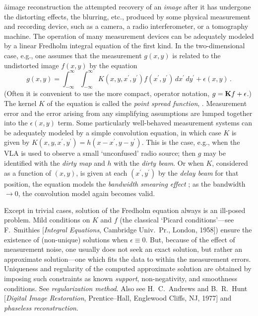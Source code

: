 \aa{image reconstruction}
the attempted recovery of an {\it image} after it has undergone
the distorting effects, the blurring, etc., produced by some
physical measurement and recording device, such as a camera,
a radio interferometer, or a tomography machine.
The operation of many measurement devices can be adequately modeled by
a linear Fredholm integral equation of the first kind.
In the two-dimensional case, e.g., one assumes
that the measurement $g(x,y)$ is related to the undistorted image $f(x,y)$
by the equation
$$g(x,y)=\int_{-\infty}^\infty\int_{-\infty}^{\infty}
          K(x,y,x^\prime,y^\prime)f(x^\prime,y^\prime)\,
          dx^\prime\,dy^\prime+\epsilon(x,y)\,.$$
(Often it is convenient to use the more compact, operator notation,
$g=\bold Kf+\epsilon$.)
The kernel $K$ of the equation is called the {\it point spread function}, \qv.
Measurement error and the error arising from any simplifying
assumptions are lumped together into the $\epsilon(x,y)$ term.
Some particularly well-behaved measurement systems can be adequately modeled
by a simple convolution equation, in which case $K$ is given by
$K(x,y,x^\prime,y^\prime)=h(x-x^\prime,y-y^\prime)$.
This is the case, e.g., when the VLA is used to observe
a small `unconfused' radio source; then $g$ may be identified with
the {\it dirty map} and $h$ with the {\it dirty beam}.
Or when $K$, considered as a function of $(x,y)$,
is given at each $(x^\prime,y^\prime)$ by the {\it delay beam}
for that position, the equation models the {\it bandwidth smearing
effect} \qv; as the bandwidth $\to0$, the convolution model
again becomes valid.
\par
Except in trivial cases, solution of the Fredholm equation always
is an ill-posed problem.
Mild conditions on $K$ and $f$
(the classical `Picard conditions'---see F.~Smithies
[{\it Integral Equations}, Cambridge Univ.\ Pr., London, 1958])
ensure the existence of (non-unique) solutions when $\epsilon\equiv0$.
But, because of the effect of measurement noise,
one usually does not seek an exact solution,
but rather an approximate solution---one which fits the data
to within the measurement errors.
Uniqueness and regularity of the computed approximate solution are obtained
by imposing such constraints as known {\it support}\/,
non-negativity, and smoothness conditions.
See {\it regularization method}.
Also see H.~C.~Andrews and B.~R.~Hunt [{\it Digital Image
Restoration}, Prentice--Hall, Englewood Cliffs, NJ, 1977]
and {\it phaseless reconstruction}.



